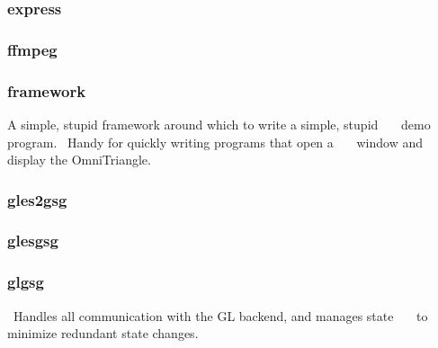 \documentclass[a4paper]{article}
\begin{document}
\clearpage\subsubsection[express]{express}
\hypertarget{RefHeading21511167907073}{}\subsubsection{}
\clearpage\subsubsection[ffmpeg]{ffmpeg}
\hypertarget{RefHeading21531167907073}{}\subsubsection{}
\clearpage\subsubsection[framework]{framework}
\hypertarget{RefHeading21551167907073}{}{\color{black}
A simple, stupid framework around which to write a simple, stupid\newline
 \ \ \ demo program. \ Handy for quickly writing programs that open a\newline
 \ \ \ window and display the OmniTriangle.}

\clearpage\subsubsection[gles2gsg]{gles2gsg}
\hypertarget{RefHeading21571167907073}{}\subsubsection{}
\clearpage\subsubsection[glesgsg]{glesgsg}
\hypertarget{RefHeading21591167907073}{}\subsubsection{}
\clearpage\subsubsection[glgsg]{glgsg}
\hypertarget{RefHeading21611167907073}{}{\color{black}
\ Handles all communication with the GL backend, and manages state\newline
 \ \ \ to minimize redundant state changes.}
\end{document}
